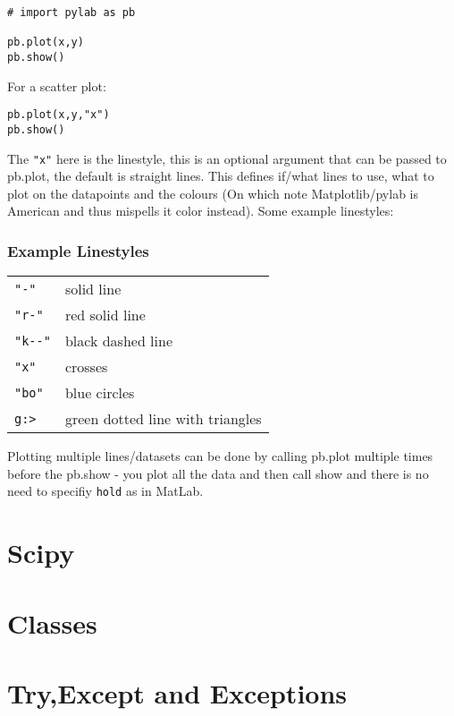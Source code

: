 \documentclass[11pt,a4paper]{article}
\begin{document}
\begin{verbatim}
# import pylab as pb

pb.plot(x,y)
pb.show()
\end{verbatim}

For a scatter plot:

\begin{verbatim}
pb.plot(x,y,"x")
pb.show()
\end{verbatim}

The \verb|"x"| here is the linestyle, this is an optional argument that can be passed to pb.plot, the default is straight lines. This defines if/what lines to use, what to plot on the datapoints and the colours (On which note Matplotlib/pylab is American and thus mispells it color instead). Some example linestyles:

\subsubsection{Example Linestyles}
\begin{center}
\begin{tabular}{l l}
\verb|"-"| & solid line\\
\verb|"r-"| & red solid line\\
\verb|"k--"| & black dashed line\\
\verb|"x"| & crosses\\
\verb|"bo"| & blue circles\\
\verb|g:>| & green dotted line with triangles\\
\end{tabular}
\end{center}

Plotting multiple lines/datasets can be done by calling pb.plot multiple times before the pb.show - you plot all the data and then call show and there is no need to specifiy \verb|hold| as in MatLab. 

\section{Scipy}

\section{Classes}

\section{Try,Except and Exceptions}
\end{document}
